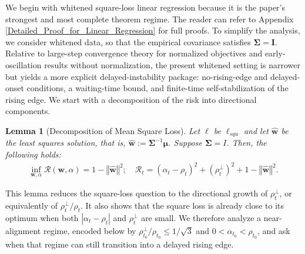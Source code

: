\documentclass[pdflatex,sn-basic]{sn-jnl}%
\theoremstyle{thmstyleone}%
\newtheorem{lemma}[theorem]{Lemma}
\newtheorem{assumption}{Assumption}%
\begin{document}
We begin with whitened square-loss linear regression because it is the paper's strongest and most complete theorem regime. The reader can refer to Appendix \ref{Detailed_Proof_for_Linear_Regression} for full proofs. To simplify the analysis, we consider whitened data, so that the empirical covariance satisfies $\mathbf{\Sigma}=\mathbf{I}$. Relative to large-step convergence theory for normalized objectives and early-oscillation results without normalization, the present whitened setting is narrower but yields a more explicit delayed-instability package: no-rising-edge and delayed-onset conditions, a waiting-time bound, and finite-time self-stabilization of the rising edge. We start with a decomposition of the risk into directional components.
\begin{lemma}[Decomposition of Mean Square Loss]\label{lemma_Decompositionofrisk}
  Let $\ell$ be $\ell_{squ}$ and let $\hat{\mathbf{w}}$ be the least squares solution, 
  that is, $\hat{\mathbf{w}} := \mathbf{\Sigma}^{-1} \boldsymbol{\mu}$. Suppose $\mathbf{\Sigma} = I$. 
   Then, the following holds:
  \begin{equation*}
  \begin{aligned}
    \inf_{\mathbf{w}, \alpha} \mathcal{R}(\mathbf{w}, \alpha) = 
    1 - \left\Vert \hat{\mathbf{w}} \right\Vert^{2};
    \quad 
    \mathcal{R}_t = 
    (\alpha_t - \rho_t)^{2} + (\rho_t^{\perp})^2 + 
    1 - \left\Vert \hat{\mathbf{w}} \right\Vert^{2}.
  \end{aligned}
  \end{equation*}
\end{lemma}
This lemma reduces the square-loss question to the directional growth of $\rho_t^{\perp}$, or equivalently of $\rho_t^{\perp}/\rho_t$. It also shows that the square loss is already close to its optimum when both $|\alpha_t-\rho_t|$ and $\rho_t^{\perp}$ are small. We therefore analyze a near-alignment regime, encoded below by $\rho_{t_0}^{\perp}/\rho_{t_0} \le 1/\sqrt{3}$ and $0 < \alpha_{t_0} < \rho_{t_0}$, and ask when that regime can still transition into a delayed rising edge.
\end{document}

